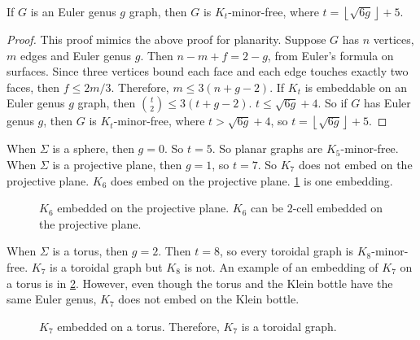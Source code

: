 \begin{theorem}\label{thm:bounded_genus_kt_free}
	If \(G\) is an Euler genus \(g\) graph, then \(G\) is \(K_t\)-minor-free, where \(t = \left\lfloor \sqrt{6g} \right\rfloor + 5\). 
\end{theorem}
\begin{proof}
	This proof mimics the above proof for planarity.
	Suppose \(G\) has \(n\) vertices, \(m\) edges and Euler genus $g$. Then \(n - m + f = 2-g\), from Euler's formula on surfaces. Since three vertices bound each face and each edge touches exactly two faces, then \(f \leq 2m/3\). Therefore, \(m \leq 3(n + g - 2)\). If \(K_t\) is embeddable on an Euler genus \(g\) graph, then \(\binom{t}{2} \leq 3 (t + g - 2)\). \(t \leq \sqrt{6g} + 4\). So if $G$ has Euler genus \(g\), then $G$ is \(K_t\)-minor-free, where \(t > \sqrt{6g} + 4\), so \(t = \left\lfloor \sqrt{6g} \right\rfloor + 5\). 
\end{proof}
When $\Sigma$ is a sphere, then $g = 0$. So $t = 5$. So planar graphs are $K_5$-minor-free. 
When $\Sigma$ is a projective plane, then $g = 1$, so $t = 7$. So $K_7$ does not embed on the projective plane. $K_6$ does embed on the projective plane. \cref{fig:k6_on_proj_plane} is one embedding.

\begin{figure}[h!]
	\centering
	
	\caption[$K_6$ embedded on the projective plane]{$K_6$ embedded on the projective plane. $K_6$ can be $2$-cell embedded on the projective plane.}\label{fig:k6_on_proj_plane}
\end{figure}

When $\Sigma$ is a torus, then $g = 2$. Then $t = 8$, so every toroidal graph is $K_8$-minor-free. $K_7$ is a toroidal graph but $K_8$ is not. An example of an embedding of $K_7$ on a torus is in \cref{fig:k7_on_torus}. However, even though the torus and the Klein bottle have the same Euler genus, $K_7$ does not embed on the Klein bottle. 

\begin{figure}[h!]
	\centering
	
	\caption[$K_7$ embedded on the torus]{$K_7$ embedded on a torus. Therefore, $K_7$ is a toroidal graph.}\label{fig:k7_on_torus}
\end{figure}

